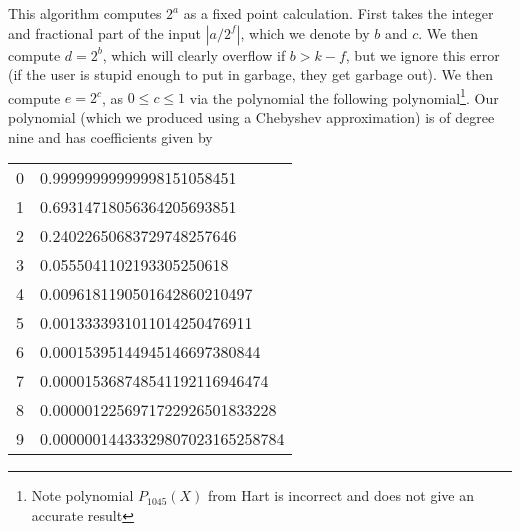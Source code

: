   This algorithm computes $2^a$ as a fixed point calculation.
  First takes the integer and fractional part of the input
$|a/2^f|$, which we denote by $b$ and $c$.
  We then compute $d=2^b$, which will clearly overflow
  if $b>k-f$, but we ignore this error (if the user is stupid
  enough to put in garbage, they get garbage out).
  We then compute $e=2^c$, as $0 \le c \le 1$ via the
  polynomial the following polynomial\footnote{Note polynomial
    $P_{1045}(X)$ from Hart \cite{Hart:1978:CA:540084} is incorrect
    and does not give an accurate result}.
  Our polynomial (which we produced using a Chebyshev approximation)
  is of degree nine and has coefficients given by
  \begin{center}
    \begin{tabular}{|c|l|}
      \hline
      0 & 0.99999999999998151058451       \\
      1 & 0.69314718056364205693851       \\
      2 & 0.24022650683729748257646       \\
      3 & 0.0555041102193305250618        \\
      4 & 0.0096181190501642860210497     \\
      5 & 0.0013333931011014250476911     \\
      6 & 0.00015395144945146697380844    \\
      7 & 0.000015368748541192116946474   \\
      8 & 0.0000012256971722926501833228  \\
      9 & 0.00000014433329807023165258784 \\
      \hline
    \end{tabular}
  \end{center}
